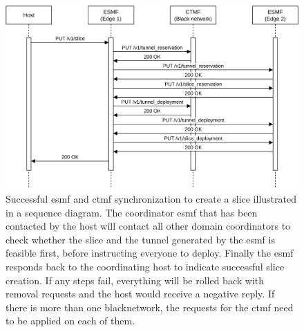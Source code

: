 \begin{figure}[H]
    \centering
    \includegraphics[width=\linewidth]{images/chapter_6/slice_creation_coordination.png}
    \caption[Slice creation on the coordinators]{Successful \acrshort{esmf} and \acrshort{ctmf} synchronization to create a slice illustrated in a sequence diagram. The coordinator \acrshort{esmf} that has been contacted by the host will contact all other domain coordinators to check whether the slice and the tunnel generated by the \acrshort{esmf} is feasible first, before instructing everyone to deploy. Finally the \acrshort{esmf} responds back to the coordinating host to indicate successful slice creation. If any steps fail, everything will be rolled back with removal requests and the host would receive a negative reply. If there is more than one \gls{blacknetwork}, the requests for the \acrshort{ctmf} need to be applied on each of them.}
    \label{fig:slice_creation_synchronization}
\end{figure}
